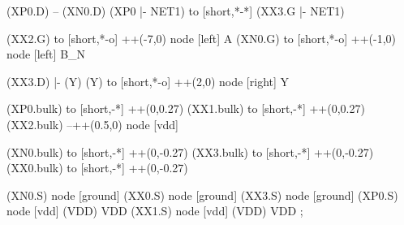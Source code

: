 \begin{circuitikz}[american]
	(XP0.D) -- (XN0.D)
	(XP0 |- NET1) to [short,*-*] (XX3.G |- NET1)
	
	(XX2.G) to [short,*-o] ++(-7,0) node [left] {A}
	(XN0.G) to [short,*-o] ++(-1,0) node [left] {B\_N}
	
	(XX3.D) |- (Y)
	(Y) to [short,*-o] ++(2,0) node [right] {Y}
	
	(XP0.bulk) to [short,-*] ++(0,0.27)
	(XX1.bulk) to [short,-*] ++(0,0.27)
	(XX2.bulk) --++(0.5,0) node [vdd] {}
	
	(XN0.bulk) to [short,-*] ++(0,-0.27)
	(XX3.bulk) to [short,-*] ++(0,-0.27)
	(XX0.bulk) to [short,-*] ++(0,-0.27)


	(XN0.S) node [ground] {}
	(XX0.S) node [ground] {}
	(XX3.S) node [ground] {}
	(XP0.S) node [vdd] (VDD) {VDD}
	(XX1.S) node [vdd] (VDD) {VDD}
;

\end{circuitikz}
